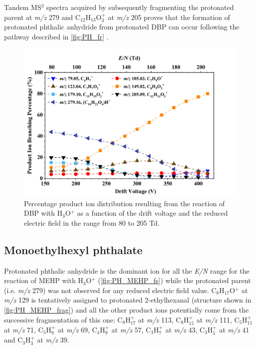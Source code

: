 Tandem MS$^3$ spectra acquired by subsequently fragmenting the protonated parent at \textit{m/z} 279 and C$_{12}$H$_{13}$O$_3^+$ at \textit{m/z} 205 proves that the formation of protonated phthalic anhydride from protonated DBP can occur following the pathway described in \autoref{fig:PH_fr} \cite{mzcloudDBP}.
%



\begin{figure}[htb]%
\centering
\includegraphics[height=0.4\textheight]{pics/DBP-BR.png}
\caption{Percentage product ion distribution resulting from the reaction of DBP with H$_3$O$^+$ as a function of the drift voltage and the reduced electric field in the range from 80 to 205 Td.}
\label{fig:PH_DBP_fs}
\end{figure}




\subsection{Monoethylhexyl phthalate}




Protonated phthalic anhydride is the dominant ion for all the \textit{E/N} range for the reaction of MEHP with H$_3$O$^+$ (\autoref{fig:PH_MEHP_fs}) while the protonated parent (i.e. \textit{m/z} 279) was not observed for any reduced electric field value.
%
C$_8$H$_{17}$O$^+$ at \textit{m/z} 129 is tentatively assigned to protonated 2-ethylhexanal (structure shown in \autoref{fig:PH_MEHP_frag}) and all the other product ions potentially come from the successive fragmentation of this one:
C$_8$H$_{17}^+$ at \textit{m/z} 113,
C$_8$H$_{15}^+$ at \textit{m/z} 111,
C$_5$H$_{11}^+$ at \textit{m/z} 71,
C$_5$H$_9^+$ at \textit{m/z} 69,
C$_4$H$_9^+$ at \textit{m/z} 57,
C$_3$H$_7^+$ at \textit{m/z} 43,
C$_3$H$_5^+$ at \textit{m/z} 41
and
C$_3$H$_3^+$ at \textit{m/z} 39.

